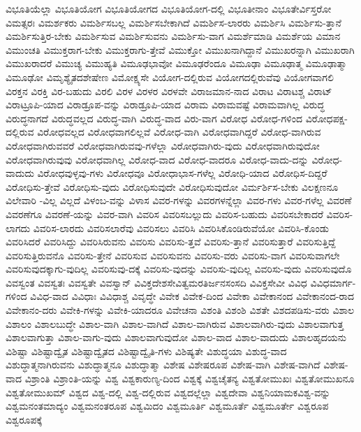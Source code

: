 {ವಿಭೂತಿಯೆಲ್ಲಾ
ವಿಭೂತಿಯೋಗ
ವಿಭೂತಿಯೋಗದ
ವಿಭೂತಿಯೋಗ-ದಲ್ಲಿ
ವಿಭೂತೀನಾಂ
ವಿಭೂತೇರ್ವಿಸ್ತರೋ
ವಿಮತ್ಸರಃ
ವಿಮರ್ಶಕರು
ವಿಮರ್ಶಿಸಬಲ್ಲ
ವಿಮರ್ಶಿಸಬೇಕಾಗಿದೆ
ವಿಮರ್ಶಿಸ-ಲಾರರು
ವಿಮರ್ಶಿಸಿ
ವಿಮರ್ಶಿಸು-ತ್ತಾನೆ
ವಿಮರ್ಶಿಸುತ್ತಿರ-ಬೇಕು
ವಿಮರ್ಶಿಸುವ
ವಿಮರ್ಶಿಸುವನು
ವಿಮರ್ಶಿಸು-ವಾಗ
ವಿಮರ್ಶೆಮಾಡಿ
ವಿಮರ್ಶೆಯ
ವಿಮಾನ
ವಿಮುಂಚತಿ
ವಿಮುಕ್ತರಾಗ-ಬೇಕು
ವಿಮುಕ್ತರಾಗು-ತ್ತೇವೆ
ವಿಮುಕ್ತೋ
ವಿಮುಖನಾಗಿದ್ದಾನೆ
ವಿಮುಖರನ್ನಾಗಿ
ವಿಮುಖರಾಗಿ
ವಿಮುಖರಾದರೆ
ವಿಮುಚ್ಯ
ವಿಮುಹ್ಯತಿ
ವಿಮೂಢಭಾವೋ
ವಿಮೂಢರೆಂದೂ
ವಿಮೂಢಾ
ವಿಮೂಢಾತ್ಮ
ವಿಮೂಢಾತ್ಮಾ
ವಿಮೂಢೋ
ವಿಮೃಶ್ಯೈತದಶೇಷೇಣ
ವಿಮೋಕ್ಷ್ಯಸೇ
ವಿಯೋಗ-ದಲ್ಲಿರುವ
ವಿಯೋಗದಲ್ಲಿರುವೆವು
ವಿಯೋಗವಾಗಲಿ
ವಿರಕ್ತನ
ವಿರಕ್ತಿ
ವಿರ-ಬಹುದು
ವಿರಲಿ
ವಿರಳ
ವಿರಳರ
ವಿರಳವೇ
ವಿರಾಜಮಾನ-ನಾದ
ವಿರಾಟ
ವಿರಾಟಶ್ಚ
ವಿರಾಟ್
ವಿರಾಟ್ರೂಪಿ-ಯಾದ
ವಿರಾಡ್ರೂಪ-ವನ್ನು
ವಿರಾಡ್ರೂಪಿ-ಯಾದ
ವಿರಾಮ
ವಿರಾಮವಷ್ಟೆ
ವಿರಾಮವಾಗಿಲ್ಲ
ವಿರುದ್ಧ
ವಿರುದ್ಧನಾಗದೆ
ವಿರುದ್ಧವಲ್ಲದ
ವಿರುದ್ಧ-ವಾಗಿ
ವಿರುದ್ಧ-ವಾದ
ವಿರು-ವಾಗ
ವಿರೋಧ
ವಿರೋಧ-ಗಳಿಂದ
ವಿರೋಧಪಕ್ಷ-ದಲ್ಲಿರುವ
ವಿರೋಧವಲ್ಲದ
ವಿರೋಧವಾಗಲಿಲ್ಲವೆ
ವಿರೋಧ-ವಾಗಿ
ವಿರೋಧವಾಗಿದ್ದರೆ
ವಿರೋಧ-ವಾಗಿರುವ
ವಿರೋಧವಾಗಿರುವವರೆ
ವಿರೋಧವಾಗಿರುವವು-ಗಳೆಲ್ಲಾ
ವಿರೋಧವಾಗಿರು-ವುದು
ವಿರೋಧವಾಗಿರುವುದೋ
ವಿರೋಧವಾಗಿರುವುವು
ವಿರೋಧವಾಗಿಲ್ಲ
ವಿರೋಧ-ವಾದ
ವಿರೋಧ-ವಾದರೂ
ವಿರೋಧ-ವಾದು-ದನ್ನು
ವಿರೋಧ-ವಾದುದು
ವಿರೋಧವುಳ್ಳವು-ಗಳು
ವಿರೋಧವೂ
ವಿರೋಧಾಭಾಸ-ಗಳೆಲ್ಲ
ವಿರೋಧಿ-ಯಾದ
ವಿರೋಧಿಸ-ದಿದ್ದರೆ
ವಿರೋಧಿಸು-ತ್ತೇವೆ
ವಿರೋಧಿಸು-ವುದು
ವಿರೋಧಿಸುವುದೇ
ವಿರೋಧಿಸುವುದೋ
ವಿರ್ಮರ್ಶಿಸ-ಬೇಕು
ವಿಲಕ್ಷಣನೂ
ವಿಲೇವಾರಿ
-ವಿಲ್ಲ
ವಿಲ್ಲದೆ
ವಿಳಂಬ-ವನ್ನು
ವಿಳಾಸ
ವಿವರ-ಗಳನ್ನು
ವಿವರಗಳನ್ನೆಲ್ಲಾ
ವಿವರ-ಗಳು
ವಿವರ-ಗಳೆಲ್ಲ
ವಿವರಣೆ
ವಿವರಣೆಗೂ
ವಿವರಣೆ-ಯನ್ನು
ವಿವರ-ವಾಗಿ
ವಿವರಿಸ
ವಿವರಿಸಬಲ್ಲುದು
ವಿವರಿಸ-ಬಹುದು
ವಿವರಿಸಬೇಕಾದರೆ
ವಿವರಿಸ-ಲಾಗದು
ವಿವರಿಸ-ಲಾರದು
ವಿವರಿಸಲಾರೆವು
ವಿವರಿಸಲು
ವಿವರಿಸಿ
ವಿವರಿಸಿಕೊಂಡಿರುವೆಯೋ
ವಿವರಿಸಿ-ಕೊಂಡು
ವಿವರಿಸಿದರೆ
ವಿವರಿಸಿದ್ದು
ವಿವರಿಸಿರುವನು
ವಿವರಿಸು
ವಿವರಿಸು-ತ್ತವೆ
ವಿವರಿಸು-ತ್ತಾನೆ
ವಿವರಿಸುತ್ತಾರೆ
ವಿವರಿಸುತ್ತಿದ್ದೆ
ವಿವರಿಸುತ್ತಿರುವನೊ
ವಿವರಿಸು-ತ್ತೇನೆ
ವಿವರಿಸುವ
ವಿವರಿಸುವನು
ವಿವರಿಸು-ವರು
ವಿವರಿಸು-ವಾಗ
ವಿವರಿಸುವಾಗಲೇ
ವಿವರಿಸುವುದಕ್ಕಾಗು-ವುದಿಲ್ಲ
ವಿವರಿಸುವು-ದಕ್ಕೆ
ವಿವರಿಸು-ವುದನ್ನು
ವಿವರಿಸು-ವುದಿಲ್ಲ
ವಿವರಿಸು-ವುದು
ವಿವರಿಸುವುದೊ
ವಿವಸ್ವಂತ
ವಿವಸ್ವತಃ
ವಿವಸ್ವತೇ
ವಿವಸ್ವಾನ್
ವಿವಿಕ್ತದೇಶಸೇವಿತ್ವಮರತಿರ್ಜನಸಂಸದಿ
ವಿವಿಕ್ತಸೇವೀ
ವಿವಿಧ
ವಿವಿಧಮಾರ್ಗ-ಗಳಿಂದ
ವಿವಿಧ-ವಾದ
ವಿವಿಧಾಃ
ವಿವಿಧಾಶ್ಚ
ವಿವೃದ್ಧೇ
ವಿವೇಕ
ವಿವೇಕ-ದಿಂದ
ವಿವೇಕಾ
ವಿವೇಕಾನಂದ
ವಿವೇಕಾನಂದ-ರಾದ
ವಿವೇಕಾನಂ-ದರು
ವಿವೇಕಿ-ಗಳನ್ನು
ವಿವೇಕಿ-ಯಾದರೂ
ವಿವೇಚನಾ
ವಿಶಂತಿ
ವಿಶಂಶಿ
ವಿಶತೇ
ವಿಶದಪಡಿಸು-ವರು
ವಿಶಾಲ
ವಿಶಾಲಂ
ವಿಶಾಲಬುದ್ಧೇ
ವಿಶಾಲ-ವಾಗಿ
ವಿಶಾಲ-ವಾಗಿದೆ
ವಿಶಾಲ-ವಾಗಿರುವ
ವಿಶಾಲವಾಗಿರು-ವುದು
ವಿಶಾಲವಾಗುತ್ತ
ವಿಶಾಲವಾಗುತ್ತಾ
ವಿಶಾಲ-ವಾಗು-ವುದು
ವಿಶಾಲವಾಗುವುದೋ
ವಿಶಾಲ-ವಾದ
ವಿಶಾಲ-ವಾದುದು
ವಿಶಾಲಹೃದಯನು
ವಿಶಿಷ್ಟಾ
ವಿಶಿಷ್ಟಾದ್ವೈತ
ವಿಶಿಷ್ಟಾದ್ವೈತದ
ವಿಶಿಷ್ಟಾದ್ವೈತಿ-ಗಳು
ವಿಶಿಷ್ಯತೇ
ವಿಶುದ್ಧಯಾ
ವಿಶುದ್ಧ-ವಾದ
ವಿಶುದ್ಧಾತ್ಮನಾಗಿರುವನು
ವಿಶುದ್ಧಾತ್ಮನೂ
ವಿಶುದ್ಧಾತ್ಮಾ
ವಿಶೇಷ
ವಿಶೇಷರೂಪ
ವಿಶೇಷ-ವಾಗಿ
ವಿಶೇಷ-ವಾಗಿದೆ
ವಿಶೇಷ-ವಾದ
ವಿಶ್ರಾಂತಿ
ವಿಶ್ರಾಂತಿ-ಯನ್ನು
ವಿಶ್ವ
ವಿಶ್ವಕಾರುಣ್ಯ-ದಿಂದ
ವಿಶ್ವಕ್ಕೆ
ವಿಶ್ವಚೈತನ್ಯ
ವಿಶ್ವತೋಮುಖಃ
ವಿಶ್ವತೋಮುಖನೂ
ವಿಶ್ವತೋಮುಖಮ್
ವಿಶ್ವದ
ವಿಶ್ವ-ದಲ್ಲಿ
ವಿಶ್ವ-ದಲ್ಲಿರುವ
ವಿಶ್ವದಲ್ಲೆಲ್ಲಾ
ವಿಶ್ವದೇವಾ
ವಿಶ್ವನಿಯಾಮಕವಿಶ್ವ-ವನ್ನು
ವಿಶ್ವಮನಂತಮಾದ್ಯಂ
ವಿಶ್ವಮನಂತರೂಪ
ವಿಶ್ವಮಿದಂ
ವಿಶ್ವಮೂರ್ತಿ
ವಿಶ್ವಮೂರ್ತೆ
ವಿಶ್ವಮೂರ್ತೇ
ವಿಶ್ವರೂಪ
ವಿಶ್ವರೂಪಕ್ಕೆ
}
